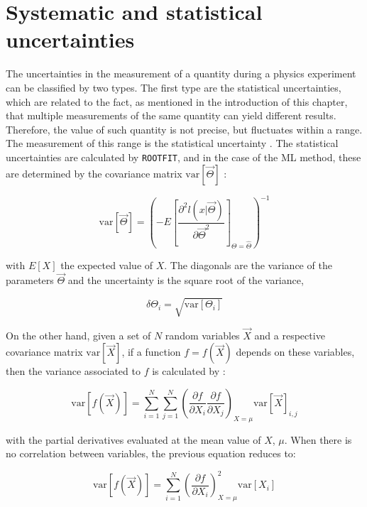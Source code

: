 \section{Systematic and statistical uncertainties}
The uncertainties in the measurement of a quantity during a physics experiment can be classified by two types. The first type are the statistical uncertainties, which are related to the fact, as mentioned in the introduction of this chapter, that multiple measurements of the same quantity can yield different results. Therefore, the value of such quantity is not precise, but fluctuates within a range. The measurement of this range is the statistical uncertainty \cite{sinervo2003definition}. The statistical uncertainties are calculated by \verb|ROOTFIT|, and in the case of the ML method, these are determined by the covariance matrix $\mathrm{var}[\vec{\Theta}]$ \cite{vsirca2016probability}:

\begin{equation}
	\mathrm{var}[\vec{\Theta}] = 
	\left(-E\left[ \frac{\partial^2 l(x | \vec{\Theta}) }{\partial \vec{\Theta} ^2}\right]_{\Theta = \hat{\Theta}}\right)^{-1}
\end{equation}

with $E[X]$ the expected value of $X$. The diagonals are the variance of the parameters $\vec{\Theta}$ and the uncertainty is the square root of the variance, 

\begin{equation}
	\delta \Theta_i = \sqrt{\mathrm{var}[\Theta_i]}
\end{equation}

On the other hand, given a set of $N$ random variables $\vec{X}$ and a respective covariance matrix $\mathrm{var}[\vec{X}]$, if a function $f = f(\vec{X})$ depends on these variables, then the variance associated to $f$ is calculated by \cite{vsirca2016probability}:

\begin{equation}
	\mathrm{var}[f(\vec{X})] = \sum_{i=1}^N \sum_{j=1}^N \left(\frac{\partial f}{\partial X_i} \frac{\partial f}{\partial X_j} \right)_{X = \mu} \mathrm{var}[\vec{X}]_{i,j}
\end{equation}

with the partial derivatives evaluated at the mean value of $X$, $\mu$. When there is no correlation between variables, the previous equation reduces to:

\begin{equation}
	\label{totaluncertainty}
	\mathrm{var}[f(\vec{X})] = \sum_{i=1}^N  \left(\frac{\partial f}{\partial X_i}\right)^2_{X = \mu} \mathrm{var}[X_i]
\end{equation}


